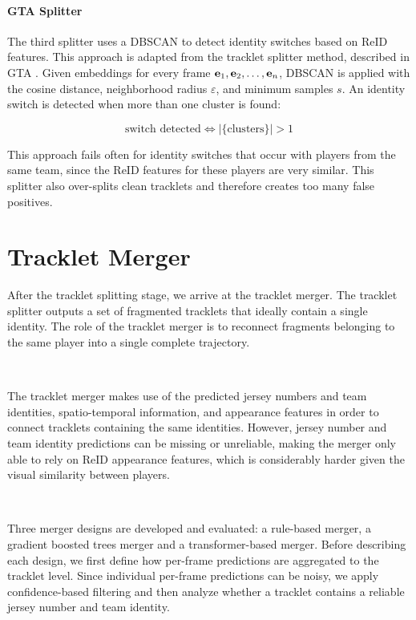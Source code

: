 \paragraph{GTA Splitter}
The third splitter uses a DBSCAN \cite{dbscan} to detect identity switches based on ReID features. This approach is adapted from the tracklet splitter method, described in GTA \cite{gta}. Given embeddings for every frame $\text{\textbf{e}}_1, \text{\textbf{e}}_2,\dots, \text{\textbf{e}}_n$, DBSCAN is applied with the cosine distance, neighborhood radius $\varepsilon$, and minimum samples $s$. An identity switch is detected when more than one cluster is found:

\begin{equation}
    \text{switch detected} \iff |\text{\{clusters\}}|>1
\end{equation}

This approach fails often for identity switches that occur with players from the same team, since the ReID features for these players are very similar. This splitter also over-splits clean tracklets and therefore creates too many false positives.


\section{Tracklet Merger}\label{tracklet_merger}
After the tracklet splitting stage, we arrive at the tracklet merger. The tracklet splitter outputs a set of fragmented tracklets that ideally contain a single identity. The role of the tracklet merger is to reconnect fragments belonging to the same player into a single complete trajectory. 

\

The tracklet merger makes use of the predicted jersey numbers and team identities, spatio-temporal information, and appearance features in order to connect tracklets containing the same identities. However, jersey number and team identity predictions can be missing or unreliable, making the merger only able to rely on ReID appearance features, which is considerably harder given the visual similarity between players.

\

Three merger designs are developed and evaluated: a rule-based merger, a gradient boosted trees merger and a transformer-based merger. Before describing each design, we first define how per-frame predictions are aggregated to the tracklet level. Since individual per-frame predictions can be noisy, we apply confidence-based filtering and then analyze whether a tracklet contains a reliable jersey number and team identity.

